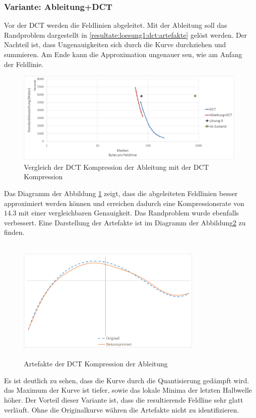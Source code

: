 \subsubsection{Variante: Ableitung+DCT}\label{resultate:dct:ableitung_dct}
Vor der DCT werden die Feldlinien abgeleitet. Mit der Ableitung soll das Randproblem dargestellt in \ref{resultate:loesung1:dct:artefakte} gelöst werden. Der Nachteil ist, dass Ungenauigkeiten sich durch die Kurve durchziehen und summieren. Am Ende kann die Approximation ungenauer sen, wie am Anfang der Feldlinie.\\
\begin{figure}[!htbp]
	\center
	\includegraphics[width=1\textwidth,keepaspectratio]{./pictures/resultate/loesung1/loesung1-1/loesung1_1.png}
	\caption{Vergleich der DCT Kompression der Ableitung mit der DCT Kompression}
	\label{resultate:loesung1:dct_ableitung:resultate}
\end{figure}
Das Diagramm der Abbildung \ref{resultate:loesung1:dct_ableitung:resultate} zeigt, dass die abgeleiteten Feldlinien besser approximiert werden können und erreichen dadurch eine Kompressionsrate von $14.3$ mit einer vergleichbaren Genauigkeit. Das Randproblem wurde ebenfalls verbessert. Eine Darstellung der Artefakte ist im Diagramm der Abbildung\ref{resultate:loesung1:dct:byte:artefakte} zu finden.\\
\begin{figure}[!htbp]
	\center
	\includegraphics[width=0.8\textwidth,height=6cm,keepaspectratio]{./pictures/resultate/loesung1/loesung1-6/artefakte.png}
	\caption{Artefakte der DCT Kompression der Ableitung}
	\label{resultate:loesung1:dct:byte:artefakte}
\end{figure} 
Es ist deutlich zu sehen, dass die Kurve durch die Quantisierung gedämpft wird. das Maximum der Kurve ist tiefer, sowie das lokale Minima der letzten Halbwelle höher. Der Vorteil dieser Variante ist, dass die resultierende Feldline sehr glatt verläuft. Ohne die Originalkurve währen die Artefakte nicht zu identifizieren.

